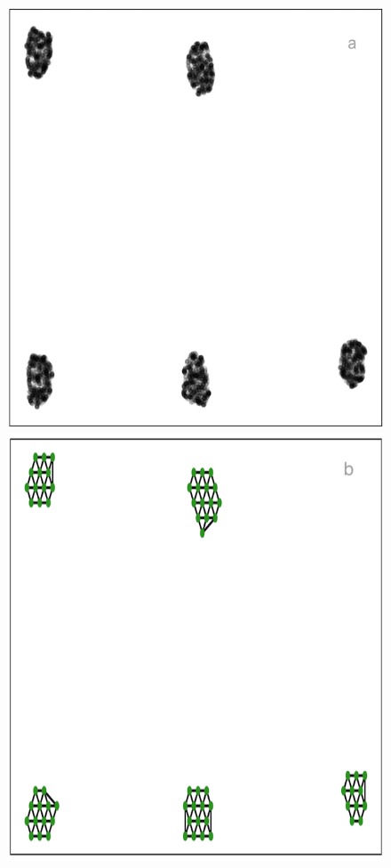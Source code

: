 \documentclass[
  12pt]{article}
\begin{document}
\begin{figure}[H]

\begin{minipage}{0.33\linewidth}
\includegraphics{figures/five_gau_clusters/umap_layout.png}\end{minipage}%
%
\begin{minipage}{0.33\linewidth}
\includegraphics{figures/five_gau_clusters/2d_model_umap.png}\end{minipage}%

\end{figure}
\end{document}
